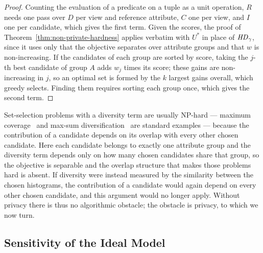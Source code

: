 \begin{proof}
Counting the evaluation of a predicate on a tuple as a unit operation, $R$ needs one pass over $D$ per view and reference attribute, $C$ one per view, and $I$ one per candidate, which gives the first term.
Given the scores, the proof of Theorem~\ref{thm:non-private-hardness} applies verbatim with $U^*$ in place of $\mathit{HD}_\gamma$, since it uses only that the objective separates over attribute groups and that $w$ is non-increasing.
If the candidates of each group are sorted by score, taking the $j$-th best candidate of group $A$ adds $w_j$ times its score; these gains are non-increasing in $j$, so an optimal set is formed by the $k$ largest gains overall, which greedy selects.
Finding them requires sorting each group once, which gives the second term.
\end{proof}

Set-selection problems with a diversity term are usually NP-hard --- maximum coverage~\cite{Feige98} and max-sum diversification~\cite{GollapudiS09} are standard examples --- because the contribution of a candidate depends on its overlap with every other chosen candidate.
Here each candidate belongs to exactly one attribute group and the diversity term depends only on how many chosen candidates share that group, so the objective is separable and the overlap structure that makes those problems hard is absent.
If diversity were instead measured by the similarity between the chosen histograms, the contribution of a candidate would again depend on every other chosen candidate, and this argument would no longer apply.
Without privacy there is thus no algorithmic obstacle; the obstacle is privacy, to which we now turn.

\subsection{Sensitivity of the Ideal Model}
\label{subsec:ideal-sensitivity}

